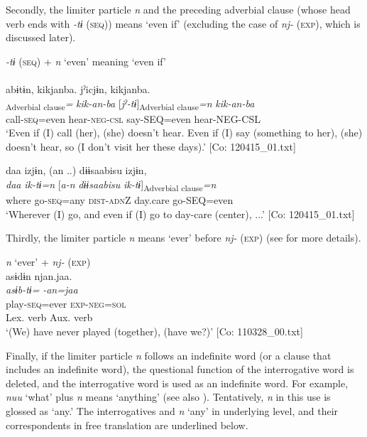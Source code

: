   Secondly, the limiter particle \textit{n} and the preceding adverbial clause (whose head verb ends with \textit{{}-tɨ} (\textsc{seq})) means ‘even if’ (excluding the case of \textit{nj-} (\textsc{exp}), which is discussed later).

\ea\label{ex:10.19}   \textit{{}-tɨ} (\textsc{seq}) + \textit{n} ‘even’ meaning ‘even if’\\
  \ea\relax  [= (8-103)]\\
      \glll    abɨtɨn,  kikjanba.  jˀicjɨn,  kikjanba.\\
      [\textit{abɨr-tɨ}]\textsubscript{Adverbial clause}\textit{=}  \textit{kik-an-ba}  [\textit{jˀ-tɨ}]\textsubscript{Adverbial clause}\textit{=n}  \textit{kik-an-ba}\\
      call-\textsc{seq}=even  hear{}-\textsc{neg}-\textsc{csl}  say-SEQ=even  hear{}-NEG-CSL\\
      \glt       ‘Even if (I) call (her), (she) doesn’t hear. Even if (I) say (something to her), (she) doesn’t hear, so (I don’t visit her these days).’ [Co: 120415\_01.txt]

  \ex  %
      \glll    daa  izjɨn,  {(an ..)}  {\textbar}dɨɨsaabisu{\textbar}  izjɨn,\\
      \textit{daa}  \textit{ik-tɨ=n}  [\textit{a-n}  \textit{dɨɨsaabisu}  \textit{ik-tɨ}]\textsubscript{Adverbial clause}\textit{=n}\\
      where  go-\textsc{seq}=any  \textsc{dist}-\textsc{adn}Z  day.care  go-SEQ=even\\
      \glt       ‘Wherever (I) go, and even if (I) go to day-care (center), ...’ [Co: 120415\_01.txt]
    \z
\z

Thirdly, the limiter particle \textit{n} means ‘ever’ before \textit{nj-} (\textsc{exp}) (see  for more details).

\ea\label{ex:10.20}   \textit{n} ‘ever’ + \textit{nj-} (\textsc{exp})\\
  \gllll    asɨdɨn  njan.jaa.\\
    \textit{asɨb-tɨ=}  \textit{-an=jaa}\\
    play-\textsc{seq}=ever  \textsc{exp}-\textsc{neg}=\textsc{sol}\\
    {Lex. verb}  {Aux. verb}\\
   \glt ‘(We) have never played (together), (have we?)’ [Co: 110328\_00.txt]
\z

  Finally, if the limiter particle \textit{n} follows an indefinite word (or a clause that includes an indefinite word), the questional function of the interrogative word is deleted, and the interrogative word is used as an indefinite word. For example, \textit{nuu} ‘what’ plus \textit{n} means ‘anything’ (see also ). Tentatively, \textit{n} in this use is glossed as ‘any.’ The interrogatives and \textit{n} ‘any’ in underlying level, and their correspondents in free translation are underlined below.

